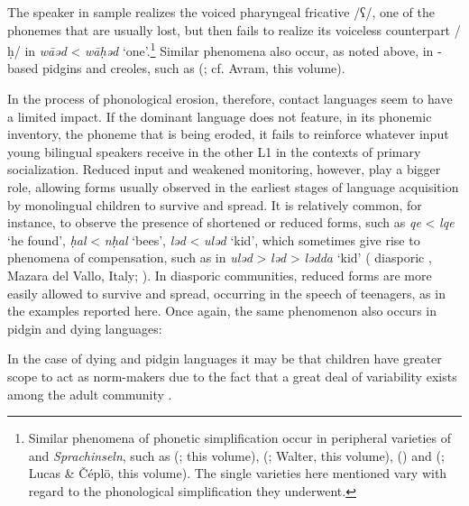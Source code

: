 \documentclass[output=paper]{langsci/langscibook}
\begin{document}
The speaker in sample   realizes the voiced {pharyngeal} fricative /ʕ/, one of the phonemes that are usually lost, but then fails to realize its voiceless counterpart /ḥ/ in \textit{wāəd} < \textit{wāḥəd} ‘one’.\footnote{Similar phenomena of phonetic {simplification} occur in peripheral varieties of  and \textit{Sprachinseln}, such as   (\citealt[19--20]{Owens1993}; this volume),   (\citealt{Borg1985}; Walter, this volume),    (\citealt{Seeger2013article}) and  (\citealt[299]{BorgAzzopardi-Alexander1997}; Lucas \& Čéplö, this volume). The single varieties here mentioned vary with regard to the phonological {simplification} they underwent.} Similar phenomena also occur, as noted above, in -based pidgins and creoles, such as   (\citealt[17, 21]{Manfredi2017}; cf. Avram, this volume). 

In the process of phonological erosion, therefore, contact languages seem to have a limited impact. If the dominant language does not feature, in its phonemic inventory, the {phoneme} that is being eroded, it fails to reinforce whatever input young bilingual speakers receive in the other L1 in the contexts of primary socialization. Reduced input and weakened monitoring, however, play a bigger role, allowing forms usually observed in the earliest stages of language acquisition by {monolingual} children to survive and spread. It is relatively common, for instance, to observe the presence of shortened or reduced forms, such as \textit{qe} < \textit{lqe} ‘he found’, \textit{ḥal} < \textit{nḥal} ‘bees’, \textit{ləd} < \textit{uləd} ‘kid’, which sometimes give rise to phenomena of compensation, such as in \textit{uləd} > \textit{ləd} > \textit{lədda} ‘kid’ ( diasporic , {Mazara del Vallo}, Italy; \citealt[85]{Danna2017book}). In diasporic communities, reduced forms are more easily allowed to survive and spread, occurring in the speech of teenagers, as in the examples reported here. Once again, the same phenomenon also occurs in {pidgin} and dying languages: 

In the case of dying and {pidgin} languages it may be that children have greater scope to act as norm-makers due to the fact that a great deal of variability exists among the adult community \citep[372–373]{Romaine1989}.
\end{document}
